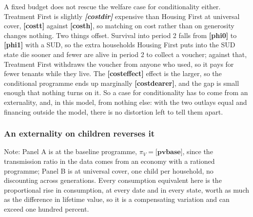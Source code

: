 \documentclass[10pt]{article}
\newcommand{\notes}[2]{\par\vspace{0.4em}%
  \begin{minipage}{#1}\footnotesize #2\end{minipage}}
\newcommand{\tabnote}[1]{\notes{\wd\ntbox}{#1}}
\begin{document}
A fixed budget does not rescue the welfare case for conditionality either.
Treatment First is slightly \emph{\textbf{[costdir]}} expensive than Housing First at universal
cover, \textbf{[costt]} against \textbf{[costh]}, so matching on cost rather than on generosity
changes nothing. Two
things offset. Survival into period 2 falls from \textbf{[phi0]} to \textbf{[phi1]} with a SUD,
so the extra households Housing First puts into the SUD state die sooner and
fewer are alive in period 2 to collect a voucher; against that, Treatment First
withdraws the voucher from anyone who used, so it pays for fewer tenants while
they live. The \textbf{[costeffect]} effect is the larger, so the conditional programme ends up
marginally \textbf{[costdearer]}, and the gap is small enough that nothing turns on it. So a case for conditionality has to come
from an externality, and, in this model, from nothing else: with the
two outlays equal and financing outside the model, there is no distortion left to
tell them apart.

\subsubsection{An externality on children reverses it}\label{sec:kids}

\begin{table}[!tb]
\centering
\caption{The externality on children}\label{tab:children}
\sbox{\ntbox}{}\usebox{\ntbox}
\tabnote{Note: Panel A is at the baseline programme, $\pi_V=\textbf{[pvbase]}$,
since the transmission ratio in the data comes from an economy with a rationed
programme; Panel B is at universal cover, one child per household, no
discounting across generations. Every consumption equivalent here is the proportional rise in consumption, at every date and in every state, worth as much as the difference in lifetime value, so it is a compensating variation and can exceed one hundred percent.}
\end{table}
\end{document}
